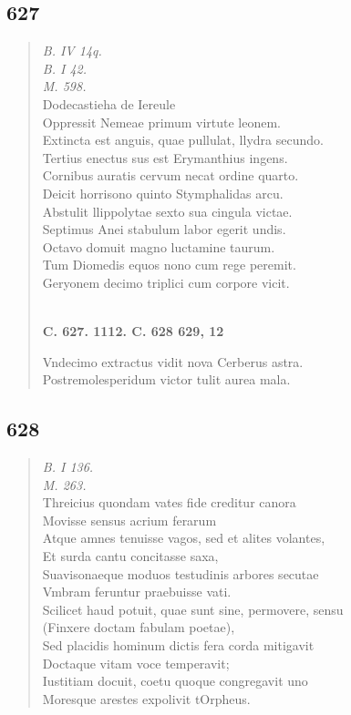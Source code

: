 \documentclass[11pt, a4paper]{report}
\begin{document}
            \subsection*{627}
      \begin{verse}
      \textit{B. IV 14q.} \\ \textit{B. I 42.} \\ \textit{M. 598.} \\ Dodecastieha de Iereule \\ Oppressit Nemeae primum virtute leonem. \\ Extincta est anguis, quae pullulat, llydra secundo. \\ Tertius enectus sus est Erymanthius ingens. \\ Cornibus auratis cervum necat ordine quarto. \\ Deicit horrisono quinto Stymphalidas arcu. \\ Abstulit llippolytae sexto sua cingula victae. \\ Septimus Anei stabulum labor egerit undis. \\ Octavo domuit magno luctamine taurum. \\ Tum Diomedis equos nono cum rege peremit. \\ Geryonem decimo triplici cum corpore vicit. \\ 
        ﻿\pagebreak 
    \begin{center} \textbf{C. 627. 1112. C. 628 629, 12} \end{center} \marginpar{[96]} Vndecimo extractus vidit nova Cerberus astra. \\ Postremolesperidum victor tulit aurea mala. \\ 
      \end{verse}
  
            \subsection*{628}
      \begin{verse}
      \textit{B. I 136.} \\ \textit{M. 263.} \\ Threicius quondam vates fide creditur canora \\ Movisse sensus acrium ferarum \\ Atque amnes tenuisse vagos, sed et alites volantes, \\ Et surda cantu concitasse saxa, \\ Suavisonaeque moduos testudinis arbores secutae \\ Vmbram feruntur praebuisse vati. \\ Scilicet haud potuit, quae sunt sine, permovere, sensu \\ (Finxere doctam fabulam poetae), \\ Sed placidis hominum dictis fera corda mitigavit \\ Doctaque vitam voce temperavit; \\ Iustitiam docuit, coetu quoque congregavit uno \\ Moresque arestes expolivit tOrpheus. \\ 
      \end{verse}
  
\end{document}
